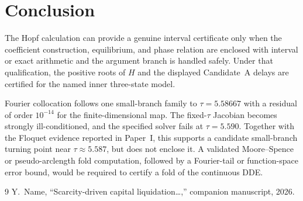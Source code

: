 \documentclass[11pt]{article}
\theoremstyle{definition}
\begin{document}
\section{Conclusion}

The Hopf calculation can provide a genuine interval certificate only when the coefficient construction, equilibrium, and phase relation are enclosed with interval or exact arithmetic and the argument branch is handled safely. Under that qualification, the positive roots of $H$ and the displayed Candidate~A delays are certified for the named inner three-state model.

Fourier collocation follows one small-branch family to $\tau=5.58667$ with a residual of order $10^{-14}$ for the finite-dimensional map. The fixed-$\tau$ Jacobian becomes strongly ill-conditioned, and the specified solver fails at $\tau=5.590$. Together with the Floquet evidence reported in Paper~I, this supports a candidate small-branch turning point near $\tau\approx5.587$, but does not enclose it. A validated Moore--Spence or pseudo-arclength fold computation, followed by a Fourier-tail or function-space error bound, would be required to certify a fold of the continuous DDE.

\begin{thebibliography}{9}
 Y.~Name, ``Scarcity-driven capital liquidation\ldots,'' companion manuscript, 2026.
\end{thebibliography}
\end{document}
